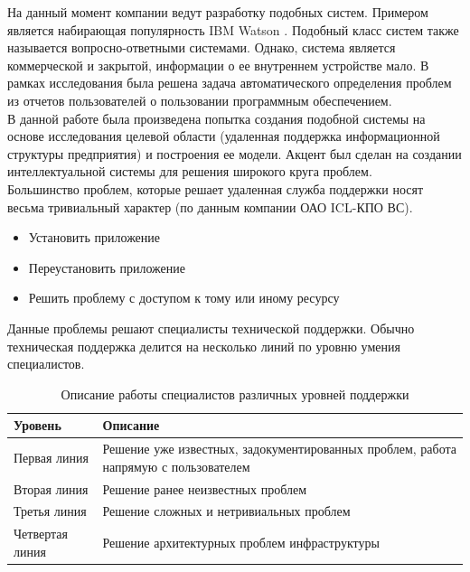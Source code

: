 На данный момент компании ведут разработку подобных систем. Примером является набирающая популярность IBM Watson \cite{WATSON-PO} \cite{WATSON-PTOP}. Подобный класс систем также называется вопросно-ответными системами. Однако, система является коммерческой и закрытой, информации о ее внутреннем устройстве мало. В рамках исследования \cite{TUTUB-2} была решена задача автоматического определения проблем из отчетов пользователей о пользовании программным обеспечением.\\
В данной работе была произведена попытка создания подобной системы на основе исследования целевой области (удаленная поддержка информационной структуры предприятия) и построения ее модели.
 Акцент был сделан на создании интеллектуальной системы для решения широкого круга проблем. \\
Большинство проблем, которые решает удаленная служба поддержки носят весьма тривиальный характер (по данным компании ОАО ICL-КПО ВС).
\begin{itemize}
	\item Установить приложение
	\item Переустановить приложение
	\item Решить проблему с доступом к тому или иному ресурсу
\end{itemize}
Данные проблемы решают специалисты технической поддержки. Обычно техническая поддержка делится на несколько линий по уровню умения специалистов.

\begin{table} [htbp]
  \centering
  \parbox{15cm}{\caption{Описание работы специалистов различных уровней поддержки}\label{TSSDescription}}
  \begin{tabular}{| p{7cm} || p{7cm} |}
  \hline
  \hline
Уровень & Описание \\
  \hline
    \hline

Первая линия	& Решение уже известных, задокументированных проблем, работа напрямую с пользователем \\
  \hline

Вторая линия  & Решение ранее неизвестных проблем \\
  \hline

Третья линия & Решение сложных и нетривиальных проблем \\
  \hline

Четвертая линия  & Решение архитектурных проблем инфраструктуры \\

  \hline
  \hline
  \end{tabular}
\end{table}


